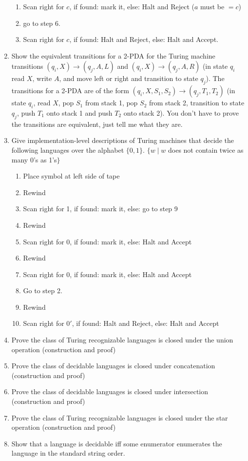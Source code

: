 \documentclass{article}
\begin{document}
\begin{enumerate}
\begin{enumerate}[label = (\arabic*)]
            \item Scan right for $c$, if found: mark it, else: Halt and Reject ($a$ must be $= c$)
            \item go to step 6.
            \item Scan right for $c$, if found: Halt and Reject, else: Halt and Accept.
        \end{enumerate}
        \item Show the equivalent transitions for a 2-PDA for the 
        Turing machine transitions $(q_i, X) \rightarrow (q_j, A, L)$ and $(q_i, X) \rightarrow 
        (q_j, A, R)$ (in state $q_i$ read $X$, write $A$, and move left or right and transition to 
        state $q_j$). The transitions for a 2-PDA are of the form $(q_i, X, S_1, S_2) \rightarrow
        (q_j, T_1, T_2)$ (in state $q_i$, read $X$, pop $S_1$ from stack 1, pop $S_2$ from stack 2, 
        transition to state $q_j$, push $T_1$ onto stack 1 and push $T_2$ onto stack 2). You don't 
        have to prove the transitions are equivalent, just tell me what they are.
        \item Give implementation-level descriptions of Turing machines that decide the following 
        languages over the alphabet $\{0,1\}$. $\{w\mid w $ does not contain twice as many 0's as 
        1's$\}$
        \begin{enumerate}[label=(\arabic*)]
            \item Place symbol at left side of tape
            \item Rewind            
            \item Scan right for 1, if found: mark it, else: go to step 9
            \item Rewind
            \item Scan right for 0, if found: mark it, else: Halt and Accept
            \item Rewind
            \item Scan right for 0, if found: mark it, else: Halt and Accept
            \item Go to step 2.
            \item Rewind
            \item Scan right for $0'$, if found: Halt and Reject, else: Halt and Accept
        \end{enumerate}
        \item Prove the class of Turing recognizable languages is closed under the union operation 
        (construction and proof)
        \item Prove the class of decidable languages is closed under concatenation (construction 
        and proof)
        \item Prove the class of decidable languages is closed under intersection (construction 
        and proof)
        \item Prove the class of Turing recognizable languages is closed under the star operation 
        (construction and proof)
        \item Show that a language is decidable iff some enumerator enumerates the language in
        the standard string order.
    \end{enumerate}
\end{document}
